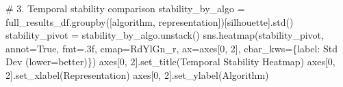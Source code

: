 \documentclass[
  letterpaper,
  DIV=11,
  numbers=noendperiod]{scrartcl}
\newenvironment{Shaded}{\begin{snugshade}}{\end{snugshade}}
\newcommand{\CommentTok}[1]{\textcolor[rgb]{0.37,0.37,0.37}{#1}}
\newcommand{\DecValTok}[1]{\textcolor[rgb]{0.68,0.00,0.00}{#1}}
\newcommand{\NormalTok}[1]{\textcolor[rgb]{0.00,0.23,0.31}{#1}}
\newcommand{\OperatorTok}[1]{\textcolor[rgb]{0.37,0.37,0.37}{#1}}
\newcommand{\StringTok}[1]{\textcolor[rgb]{0.13,0.47,0.30}{#1}}
\newcommand{\VariableTok}[1]{\textcolor[rgb]{0.07,0.07,0.07}{#1}}
\renewenvironment{Shaded}{%
  \begin{tcolorbox}[%
    enhanced,%
    colback=codebg,%
    colframe=codebg,%
    borderline west={3pt}{0pt}{sectionblue},%
    fontupper=\small\ttfamily,%
    boxrule=0pt,%
    arc=0pt,%
    boxsep=5pt,%
    left=2mm,%
    right=2mm,%
    top=2mm,%
    bottom=2mm%
  ]%
}{%
  \end{tcolorbox}%
}
\begin{document}
\begin{Shaded}
\begin{Highlighting}[]
\CommentTok{\# 3. Temporal stability comparison}
\NormalTok{stability\_by\_algo }\OperatorTok{=}\NormalTok{ full\_results\_df.groupby([}\StringTok{\textquotesingle{}algorithm\textquotesingle{}}\NormalTok{, }\StringTok{\textquotesingle{}representation\textquotesingle{}}\NormalTok{])[}\StringTok{\textquotesingle{}silhouette\textquotesingle{}}\NormalTok{].std()}
\NormalTok{stability\_pivot }\OperatorTok{=}\NormalTok{ stability\_by\_algo.unstack()}
\NormalTok{sns.heatmap(stability\_pivot, annot}\OperatorTok{=}\VariableTok{True}\NormalTok{, fmt}\OperatorTok{=}\StringTok{\textquotesingle{}.3f\textquotesingle{}}\NormalTok{, cmap}\OperatorTok{=}\StringTok{\textquotesingle{}RdYlGn\_r\textquotesingle{}}\NormalTok{, }
\NormalTok{            ax}\OperatorTok{=}\NormalTok{axes[}\DecValTok{0}\NormalTok{, }\DecValTok{2}\NormalTok{], cbar\_kws}\OperatorTok{=}\NormalTok{\{}\StringTok{\textquotesingle{}label\textquotesingle{}}\NormalTok{: }\StringTok{\textquotesingle{}Std Dev (lower=better)\textquotesingle{}}\NormalTok{\})}
\NormalTok{axes[}\DecValTok{0}\NormalTok{, }\DecValTok{2}\NormalTok{].set\_title(}\StringTok{\textquotesingle{}Temporal Stability Heatmap\textquotesingle{}}\NormalTok{)}
\NormalTok{axes[}\DecValTok{0}\NormalTok{, }\DecValTok{2}\NormalTok{].set\_xlabel(}\StringTok{\textquotesingle{}Representation\textquotesingle{}}\NormalTok{)}
\NormalTok{axes[}\DecValTok{0}\NormalTok{, }\DecValTok{2}\NormalTok{].set\_ylabel(}\StringTok{\textquotesingle{}Algorithm\textquotesingle{}}\NormalTok{)}


\end{Highlighting}
\end{Shaded}
\end{document}
